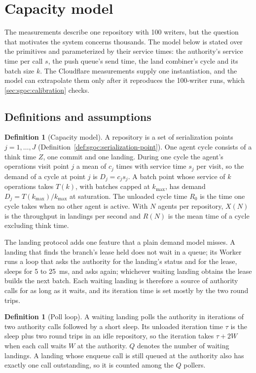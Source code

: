 \documentclass[11pt,letterpaper]{article}
\theoremstyle{definition}
\newtheorem{definition}[theorem]{Definition}
\theoremstyle{remark}
\begin{document}
\section{Capacity model}
\label{sec:sgoc:capacity}

The measurements describe one repository with 100 writers, but the question that motivates the system concerns thousands. The model below is stated over the primitives and parameterized by their service times: the authority's service time per call $s$, the push queue's send time, the land combiner's cycle and its batch size $k$. The Cloudflare measurements supply one instantiation, and the model can extrapolate them only after it reproduces the 100-writer runs, which \cref{sec:sgoc:calibration} checks.

\subsection{Definitions and assumptions}

\begin{definition}[Capacity model]
\label{def:sgoc:capacity}
A repository is a set of serialization points $j = 1, \dots, J$ (Definition~\ref{def:sgoc:serialization-point}). One agent cycle consists of a think time $Z$, one commit and one landing. During one cycle the agent's operations visit point $j$ a mean of $c_j$ times with service time $s_j$ per visit, so the demand of a cycle at point $j$ is $D_j = c_j s_j$. A batch point whose service of $k$ operations takes $T(k)$, with batches capped at $k_{\max}$, has demand $D_j = T(k_{\max})/k_{\max}$ at saturation. The unloaded cycle time $R_0$ is the time one cycle takes when no other agent is active. With $N$ agents per repository, $X(N)$ is the throughput in landings per second and $R(N)$ is the mean time of a cycle excluding think time.
\end{definition}

The landing protocol adds one feature that a plain demand model misses. A landing that finds the branch's lease held does not wait in a queue; its Worker runs a loop that asks the authority for the landing's status and for the lease, sleeps for 5 to 25~ms, and asks again; whichever waiting landing obtains the lease builds the next batch. Each waiting landing is therefore a source of authority calls for as long as it waits, and its iteration time is set mostly by the two round trips.

\begin{definition}[Poll loop]
\label{def:sgoc:poll}
A waiting landing polls the authority in iterations of two authority calls followed by a short sleep. Its unloaded iteration time $\tau$ is the sleep plus two round trips in an idle repository, so the iteration takes $\tau + 2W$ when each call waits $W$ at the authority. $Q$ denotes the number of waiting landings. A landing whose enqueue call is still queued at the authority also has exactly one call outstanding, so it is counted among the $Q$ pollers.
\end{definition}
\end{document}
